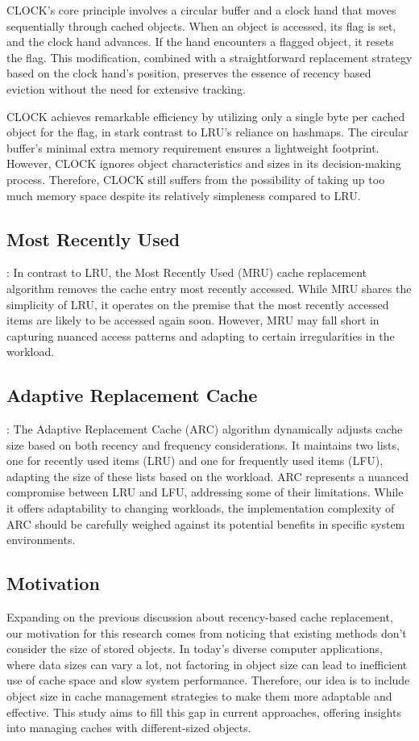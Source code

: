 \documentclass[journal,10.5pt,onecolumn]{IEEEtran}
\begin{document}
CLOCK's core principle involves a circular buffer and a clock hand that moves sequentially through cached objects. When an object is accessed, its flag is set, and the clock hand advances. If the hand encounters a flagged object, it resets the flag. This modification, combined with a straightforward replacement strategy based on the clock hand's position, preserves the essence of recency based eviction without the need for extensive tracking.

CLOCK achieves remarkable efficiency by utilizing only a single byte per cached object for the flag, in stark contrast to LRU's reliance on hashmaps. The circular buffer's minimal extra memory requirement ensures a lightweight footprint. However, CLOCK ignores object characteristics and sizes in its decision-making process. Therefore, CLOCK still suffers from the possibility of taking up too much memory space despite its relatively simpleness compared to LRU.

\subsection{Most Recently Used}: In contrast to LRU, the Most Recently Used (MRU) cache replacement algorithm removes the cache entry most recently accessed. While MRU shares the simplicity of LRU, it operates on the premise that the most recently accessed items are likely to be accessed again soon. However, MRU may fall short in capturing nuanced access patterns and adapting to certain irregularities in the workload.

\subsection{Adaptive Replacement Cache}: The Adaptive Replacement Cache (ARC) algorithm dynamically adjusts cache size based on both recency and frequency considerations. It maintains two lists, one for recently used items (LRU) and one for frequently used items (LFU), adapting the size of these lists based on the workload. ARC represents a nuanced compromise between LRU and LFU, addressing some of their limitations. While it offers adaptability to changing workloads, the implementation complexity of ARC should be carefully weighed against its potential benefits in specific system environments.

\subsection{Motivation}
Expanding on the previous discussion about recency-based cache replacement, our motivation for this research comes from noticing that existing methods don't consider the size of stored objects. In today's diverse computer applications, where data sizes can vary a lot, not factoring in object size can lead to inefficient use of cache space and slow system performance. Therefore, our idea is to include object size in cache management strategies to make them more adaptable and effective. This study aims to fill this gap in current approaches, offering insights into managing caches with different-sized objects.
\end{document}
